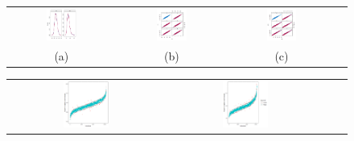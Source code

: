 \documentclass[12pt, fullpage, a4paper]{article}
\begin{document}
\begin{figure} [ht!]
	\centering
	\begin{tabular}{cccc}
		\includegraphics[width=0.3\textwidth]{plots/densitycase1} &
		\includegraphics[width=0.3\textwidth]{plots/scattercase1hm} &
		\includegraphics[width=0.3\textwidth]{plots/scattercase1wm} \\
		\textnormal{(a)}  & \textnormal{(b)} & \textnormal{(c)}  \\[6pt]
	\end{tabular}
	\begin{tabular}{cccc}
		\includegraphics[width=0.3\textwidth]{plots/distributioncase1hm} &
		\includegraphics[width=0.3\textwidth]{plots/distributioncase1wm} \\

\end{tabular}
\end{figure}
\end{document}
